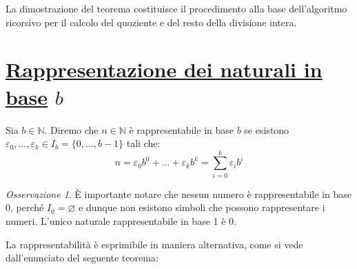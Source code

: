 \documentclass[oneside]{book}
\theoremstyle{remark}
\newtheorem*{osservaz}{Osservazione}
\begin{document}
La dimostrazione del teorema costituisce il procedimento alla base
dell'algoritmo ricorsivo per il calcolo del quoziente e del resto
della divisione intera.
\begin{tcolorbox}[enhanced, breakable, colback=red!30, colframe=red!30!black, title=Algoritmo di divisione euclidea]

\end{tcolorbox}

\section{\underline{Rappresentazione dei naturali in base} $b$}
\begin{tcolorbox}[colback=yellow!30, colframe=yellow!30!black, title=Rappresentabilità dei naturali in base arbitraria]
Sia $b\in\mathbb{N}$. Diremo che $n\in\mathbb{N}$ è rappresentabile in base $b$ se
esistono $\varepsilon_0,...,\varepsilon_k\in I_b=\{0,...,b-1\}$ tali che:
\[ n=\varepsilon_0b^0+...+\varepsilon_k b^k = \sum_{i=0}^{k}\varepsilon_ib^i \]
\end{tcolorbox}

\begin{osservaz}
È importante notare che nessun numero è rappresentabile in base 0, perché
$I_0 = \varnothing$ e dunque non esistono simboli che possono rappresentare
i numeri. L'unico naturale rappresentabile in base 1 è 0.
\end{osservaz}

La rappresentabilità è esprimibile in maniera alternativa, come si vede dall'enunciato
del seguente teorema:
\end{document}
